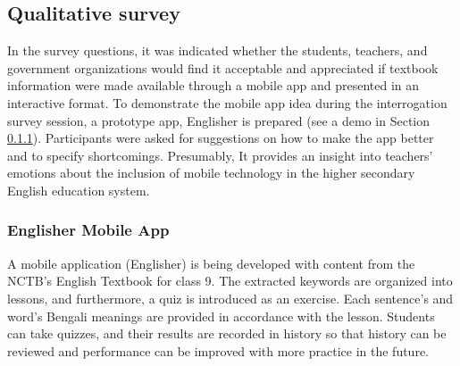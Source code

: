 \documentclass[sn-mathphys,Numbered]{sn-jnl}%
\theoremstyle{thmstyleone}%
\theoremstyle{thmstyletwo}%
\theoremstyle{thmstylethree}%
\begin{document}
\subsection{Qualitative survey}\label{qual_survey} In the survey questions, it was indicated whether the students, teachers, and government organizations would find it acceptable and appreciated if textbook information were made available through a mobile app and presented in an interactive format. To demonstrate the mobile app idea during the interrogation survey session, a prototype app, Englisher is prepared (see a demo in Section \ref{Englisher_mobile_app}). Participants were asked for suggestions on how to make the app better and to specify shortcomings. Presumably, It provides an insight into teachers’ emotions about the inclusion of mobile technology in the higher secondary English education system.\\

\subsubsection{Englisher Mobile App}
\label{Englisher_mobile_app}
A mobile application (Englisher) is being developed with content from the NCTB’s English Textbook for class 9. The extracted keywords are organized into lessons, and furthermore, a quiz is introduced as an exercise. Each sentence's and word's Bengali meanings are provided in accordance with the lesson. Students can take quizzes, and their results are recorded in history so that history can be reviewed and performance can be improved with more practice in the future.
\end{document}

